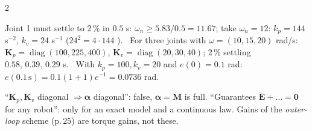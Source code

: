 \begin{multicols}{2}
\begin{worked}
Joint 1 must settle to 2\,\% in $0.5$ s: $\omega_n\ge5.83/0.5=11.67$; take $\omega_n=12$: $k_p=144$ s$^{-2}$, $k_v=24$ s$^{-1}$ ($24^2=4\cdot144$ \checkmark). \chk\ For three joints with $\omega=(10,15,20)$ rad/s: $\mathbf K_p=\operatorname{diag}(100,225,400)$, $\mathbf K_v=\operatorname{diag}(20,30,40)$; 2\,\% settling $0.58,\,0.39,\,0.29$ s. \chk\ With $k_p=100,k_v=20$ and $e(0)=0.1$ rad: $e(0.1\,\text{s})=0.1(1+1)e^{-1}=0.0736$ rad. \chk
\end{worked}
\begin{trap}
``$\mathbf K_p,\mathbf K_v$ diagonal $\Rightarrow\boldsymbol\alpha$ diagonal'': false, $\boldsymbol\alpha=\mathbf M$ is full. ``Guarantees $\ddot{\mathbf E}+\dots=\mathbf 0$ for any robot'': only for an exact model and a continuous law. Gains of the \emph{outer-loop} scheme (p.\,25) are torque gains, not these.
\end{trap}


\end{multicols}
